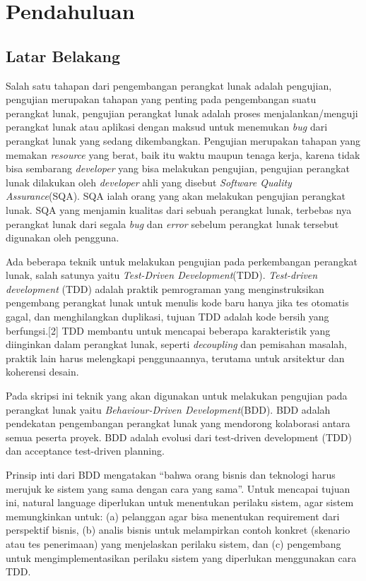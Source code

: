 \chapter{Pendahuluan}
\label{chap:intro}
   
\section{Latar Belakang}
\label{sec:label}

Salah satu tahapan dari pengembangan perangkat lunak adalah pengujian, pengujian merupakan tahapan yang penting pada pengembangan suatu perangkat lunak, pengujian perangkat lunak adalah  proses menjalankan/menguji perangkat lunak atau aplikasi dengan maksud untuk menemukan \textit{bug} dari perangkat lunak yang sedang dikembangkan. Pengujian merupakan tahapan yang memakan \textit{resource} yang berat, baik itu waktu maupun tenaga kerja, karena tidak bisa sembarang \textit{developer} yang bisa melakukan pengujian, pengujian perangkat lunak dilakukan oleh \textit{developer} ahli yang disebut \textit{Software Quality Assurance}(SQA). SQA ialah orang yang akan melakukan pengujian perangkat lunak. SQA yang menjamin kualitas dari sebuah perangkat lunak, terbebas nya perangkat lunak dari segala \textit{bug} dan \textit{error} sebelum perangkat lunak tersebut digunakan oleh pengguna.	

Ada beberapa teknik untuk melakukan pengujian pada perkembangan perangkat lunak, salah satunya yaitu \textit{Test-Driven Development}(TDD). \textit{Test-driven development} (TDD) adalah praktik pemrograman yang menginstruksikan pengembang perangkat lunak untuk menulis kode baru hanya jika tes otomatis gagal, dan menghilangkan duplikasi, tujuan TDD adalah kode bersih yang berfungsi.[2] TDD  membantu untuk mencapai beberapa karakteristik yang diinginkan dalam perangkat lunak, seperti \textit{decoupling} dan pemisahan masalah, praktik lain harus melengkapi penggunaannya, terutama untuk arsitektur dan koherensi desain.

Pada skripsi ini teknik yang akan digunakan untuk melakukan pengujian pada perangkat lunak yaitu \textit{Behaviour-Driven Development}(BDD). BDD adalah pendekatan pengembangan perangkat lunak yang mendorong kolaborasi antara semua peserta proyek. BDD adalah evolusi dari test-driven development (TDD) dan acceptance test-driven planning.

Prinsip inti dari BDD mengatakan “bahwa orang bisnis dan teknologi harus merujuk ke sistem yang sama dengan cara yang sama”. Untuk mencapai tujuan ini, natural language diperlukan untuk menentukan perilaku sistem, agar sistem memungkinkan untuk: (a) pelanggan agar bisa menentukan requirement dari perspektif bisnis, (b) analis bisnis untuk melampirkan contoh konkret (skenario atau tes penerimaan) yang menjelaskan perilaku sistem, dan (c) pengembang untuk mengimplementasikan perilaku sistem yang diperlukan menggunakan cara TDD. 

